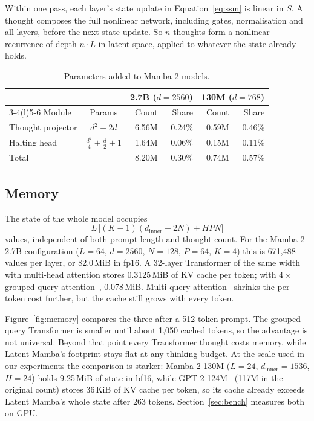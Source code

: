 \documentclass[10pt]{article}
\makeatletter
\renewcommand\paragraph{\@startsection{paragraph}{4}{\z@}{0.01em}{-1em}{\normalfont\normalsize\bfseries}}
\makeatother
\begin{document}
\paragraph{Why thoughts add expressivity.} Within one pass, each layer's state update in Equation~\eqref{eq:ssm} is linear in $S$. A thought composes the full nonlinear network, including gates, normalisation and all layers, before the next state update. So $n$ thoughts form a nonlinear recurrence of depth $n\cdot L$ in latent space, applied to whatever the state already holds.

\begin{table}[t]
\centering
\small
\begin{tabular}{@{}lcrrrr@{}}
\toprule
& & \multicolumn{2}{c}{2.7B ($d{=}2560$)} & \multicolumn{2}{c}{130M ($d{=}768$)} \\
\cmidrule(lr){3-4}\cmidrule(l){5-6}
Module & Params & Count & Share & Count & Share \\
\midrule
Thought projector & $d^2 + 2d$ & 6.56M & 0.24\% & 0.59M & 0.46\% \\
Halting head & $\tfrac{d^2}{4} + \tfrac{d}{2} + 1$ & 1.64M & 0.06\% & 0.15M & 0.11\% \\
\midrule
Total & & 8.20M & 0.30\% & 0.74M & 0.57\% \\
\bottomrule
\end{tabular}
\caption{Parameters added to Mamba-2 models.}
\label{tab:params}
\end{table}

\subsection{Memory}

The state of the whole model occupies
\begin{equation}
L\,\big[(K-1)(d_{\text{inner}} + 2N) + HPN\big]
\label{eq:mem}
\end{equation}
values, independent of both prompt length and thought count. For the Mamba-2 2.7B configuration ($L{=}64$, $d{=}2560$, $N{=}128$, $P{=}64$, $K{=}4$) this is 671{,}488 values per layer, or 82.0\,MiB in fp16. A 32-layer Transformer of the same width with multi-head attention stores 0.3125\,MiB of KV cache per token; with $4\times$ grouped-query attention~\cite{ainslie2023gqa}, 0.078\,MiB. Multi-query attention~\cite{shazeer2019mqa} shrinks the per-token cost further, but the cache still grows with every token.

Figure~\ref{fig:memory} compares the three after a 512-token prompt. The grouped-query Transformer is smaller until about 1{,}050 cached tokens, so the advantage is not universal. Beyond that point every Transformer thought costs memory, while Latent Mamba's footprint stays flat at any thinking budget. At the scale used in our experiments the comparison is starker: Mamba-2 130M ($L{=}24$, $d_{\text{inner}}{=}1536$, $H{=}24$) holds 9.25\,MiB of state in bf16, while GPT-2 124M~\cite{radford2019gpt2} (117M in the original count) stores 36\,KiB of KV cache per token, so its cache already exceeds Latent Mamba's whole state after 263 tokens. Section~\ref{sec:bench} measures both on GPU.
\end{document}
